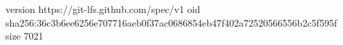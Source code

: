 version https://git-lfs.github.com/spec/v1
oid sha256:36c3b6ee6256e707716aeb0f37ac0686854eb47f402a72520566556b2c5f595f
size 7021
